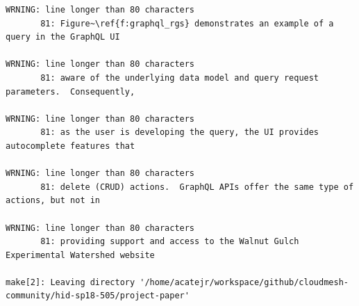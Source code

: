 \begin{tiny}
\begin{verbatim}
WRNING: line longer than 80 characters
       81: Figure~\ref{f:graphql_rgs} demonstrates an example of a query in the GraphQL UI 

WRNING: line longer than 80 characters
       81: aware of the underlying data model and query request parameters.  Consequently, 

WRNING: line longer than 80 characters
       81: as the user is developing the query, the UI provides autocomplete features that 

WRNING: line longer than 80 characters
       81: delete (CRUD) actions.  GraphQL APIs offer the same type of actions, but not in 

WRNING: line longer than 80 characters
       81: providing support and access to the Walnut Gulch Experimental Watershed website 

make[2]: Leaving directory '/home/acatejr/workspace/github/cloudmesh-community/hid-sp18-505/project-paper'
\end{verbatim}
\end{tiny}
